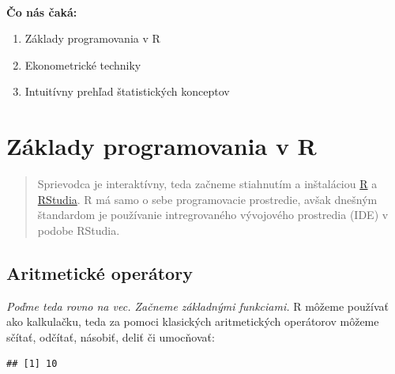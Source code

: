 ~

\textbf{Čo nás čaká:}

\begin{enumerate}
\def\labelenumi{\arabic{enumi}.}
\tightlist
\item
  Základy programovania v R
\item
  Ekonometrické techniky
\item
  Intuitívny prehľad štatistických konceptov
\end{enumerate}

\newpage

\hypertarget{zuxe1klady-programovania-v-r}{%
\section{Základy programovania v R}\label{zuxe1klady-programovania-v-r}}

\begin{quote}
Sprievodca je interaktívny, teda začneme stiahnutím a inštaláciou
\href{https://cran.r-project.org/mirrors.html}{R} a
\href{https://cran.r-project.org/mirrors.html}{RStudia}. R má samo o
sebe programovacie prostredie, avšak dnešným štandardom je používanie
intregrovaného vývojového prostredia (IDE) v podobe RStudia.
\end{quote}

\hypertarget{aritmetickuxe9-operuxe1tory}{%
\subsection{Aritmetické operátory}\label{aritmetickuxe9-operuxe1tory}}

\emph{Poďme teda rovno na vec. Začneme základnými funkciami.} R môžeme
používať ako kalkulačku, teda za pomoci klasických aritmetických
operátorov môžeme sčítať, odčítať, násobiť, deliť či umocňovať:

\begin{Shaded}
\begin{Highlighting}[]
 \OperatorTok{+}\StringTok{ }
\end{Highlighting}
\end{Shaded}

\begin{verbatim}
## [1] 10
\end{verbatim}

\begin{Shaded}
\begin{Highlighting}[]
 \OperatorTok{-}\StringTok{ }
\end{Highlighting}
\end{Shaded}

